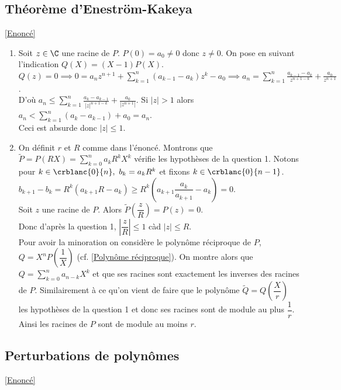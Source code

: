 \documentclass{book}
\begin{document}
	\subsection{Théorème d'Eneström-Kakeya }
	\label{sec:théorème-d'eneström-kakeya}
	\textcolor{blue}{\hyperref[Théorème d'Eneström-Kakeya]{[Enoncé]}}\\
	\begin{enumerate}[leftmargin=*]
		\item Soit $z\in \C$ une racine de $P$. $P(0)=a_0\ne0$ donc $z\ne 0$. On pose en suivant l'indication $Q(X)=(X-1)P(X)$.\\
		$Q(z)=0\implies 0=a_nz^{n+1}+\displaystyle\sum_{k=1}^n(a_{k-1}-a_k)z^k-a_0\implies a_n=\sum_{k=1}^n\frac{a_{k-1}-a_k}{z^{n+1-k}}+\frac{a_0}{z^{n+1}}$.\\
		D'où $a_n\leq \displaystyle\sum_{k=1}^n\frac{a_k-a_{k-1}}{|z|^{n+1-k}}+\frac{a_0}{|z^{n+1}|}$. Si $|z|>1$ alors $a_n<\displaystyle\sum_{k=1}^n(a_k-a_{k-1})+a_0=a_n$.\\
		Ceci est absurde donc $|z|\leq 1$.
		\item On définit $r$ et $R$ comme dans l'énoncé. Montrons que $\tilde P=P(RX)=\displaystyle\sum_{k=0}^na_kR^kX^k$ vérifie les hypothèses de la question 1. Notons pour $k\in \crblanc{0}{n},\ b_k=a_kR^k$ et fixons $k\in \crblanc{0}{n-1}$.\\
		$b_{k+1}-b_k=R^k(a_{k+1}R-a_k)\geq R^k\left(a_{k+1}\dfrac{a_k}{a_{k+1}}-a_k\right)=0$.\\
		Soit $z$ une racine de $P$. Alors $\tilde P\left(\dfrac{z}{R}\right)=P(z)=0$.\\
		Donc d'après la question 1, $\left|\dfrac{z}{R}\right|\leq 1$ càd $|z|\leq R$.\\
		Pour avoir la minoration on considère le polynôme réciproque de $P$, $Q=X^nP\left(\dfrac{1}{X}\right)$ (cf. \ref{Polynôme réciproque}). On montre alors que $Q=\displaystyle\sum_{k=0}^na_{n-k}X^k$ et que ses racines sont exactement les inverses des racines de $P$. Similairement à ce qu'on vient de faire que le polynôme $\tilde Q=Q\left(\dfrac{X}{r}\right)$ les hypothèses de la question 1 et donc ses racines sont de module au plus $\dfrac{1}{r}$. Ainsi les racines de $P$ sont de module au moins $r$.
	\end{enumerate}
	
	\subsection{Perturbations de polynômes}
	\label{sec:pertubations-de-polynômes}
	\textcolor{blue}{\hyperref[Pertubations de polynômes]{[Enoncé]}}\\
	
\end{document}
